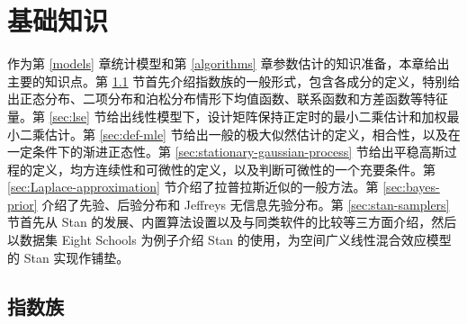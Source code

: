 \documentclass[12pt,a4paper,UTF8,twoside]{book}
\theoremstyle{definition}
\theoremstyle{definition}
\theoremstyle{definition}
\theoremstyle{remark}
\begin{document}
\hypertarget{prepare}{%
\chapter{基础知识}\label{prepare}}

作为第 \ref{models} 章统计模型和第 \ref{algorithms}
章参数估计的知识准备，本章给出主要的知识点。第 \ref{sec:exp}
节首先介绍指数族的一般形式，包含各成分的定义，特别给出正态分布、二项分布和泊松分布情形下均值函数、联系函数和方差函数等特征量。第
\ref{sec:lse}
节给出线性模型下，设计矩阵保持正定时的最小二乘估计和加权最小二乘估计。第
\ref{sec:def-mle}
节给出一般的极大似然估计的定义，相合性，以及在一定条件下的渐进正态性。第
\ref{sec:stationary-gaussian-process}
节给出平稳高斯过程的定义，均方连续性和可微性的定义，以及判断可微性的一个充要条件。第
\ref{sec:Laplace-approximation} 节介绍了拉普拉斯近似的一般方法。第
\ref{sec:bayes-prior} 介绍了先验、后验分布和 Jeffreys 无信息先验分布。第
\ref{sec:stan-samplers} 节首先从 Stan
的发展、内置算法设置以及与同类软件的比较等三方面介绍，然后以数据集 Eight
Schools 为例子介绍 Stan 的使用，为空间广义线性混合效应模型的 Stan
实现作铺垫。

\hypertarget{sec:exp}{%
\section{指数族}\label{sec:exp}}
\end{document}
